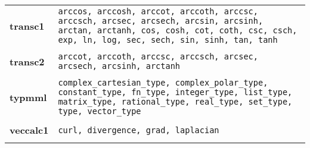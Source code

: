 \begin{tabular}{p{2in} p{2in}}

{\bf transc1 }& {\tt arccos, arccosh, arccot, arccoth, arccsc, arccsch, arcsec, arcsech, arcsin, arcsinh, arctan, arctanh, cos,
cosh, cot, coth, csc, csch, exp, ln, log, sec, sech, sin, sinh, tan, tanh}\\ \\


{\bf transc2 }& {\tt arccot, arccoth, arccsc, arccsch, arcsec, arcsech, arcsinh, arctanh}\\ \\


{\bf typmml }& {\tt complex\_cartesian\_type, complex\_polar\_type, constant\_type, fn\_type, integer\_type, list\_type,
matrix\_type, rational\_type, real\_type, set\_type, type, vector\_type}\\ \\


{\bf veccalc1 }& {\tt curl, divergence, grad, laplacian}\\ \\


\end{tabular}

